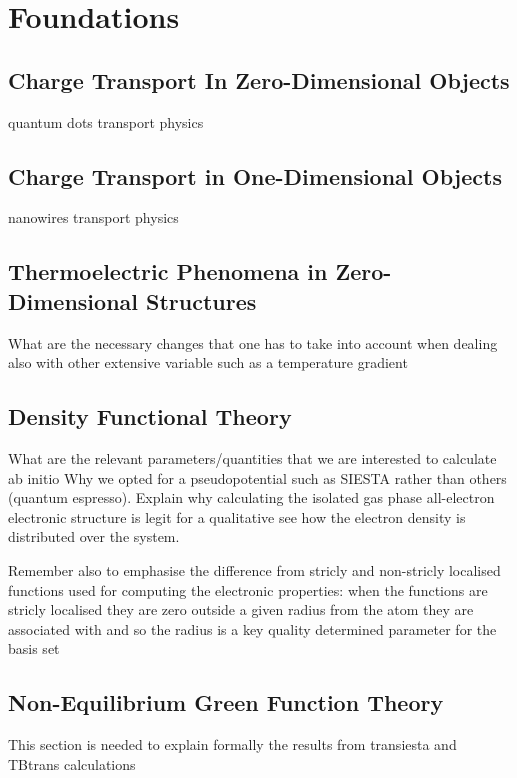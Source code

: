 \chapter{\label{ch:theory}Foundations}

\minitoc

\section{Charge Transport In Zero-Dimensional Objects}

quantum dots transport physics

\section{Charge Transport in One-Dimensional Objects}

nanowires transport physics

\section{Thermoelectric Phenomena in Zero-Dimensional Structures}

What are the necessary changes that one has to take into account
when dealing also with other extensive variable such as a temperature gradient

\section{Density Functional Theory}

What are the relevant parameters/quantities that we are interested to calculate ab initio
Why we opted for a pseudopotential such as SIESTA rather than others (quantum espresso).
Explain why calculating the isolated gas phase all-electron electronic structure is legit for a 
qualitative see how the electron density is distributed over the system.

Remember also to emphasise the difference from stricly and non-stricly localised functions
used for computing the electronic properties: when the functions are stricly localised they are zero
outside a given radius from the atom they are associated with and so the radius is a key quality determined parameter for the basis set


\section{Non-Equilibrium Green Function Theory}

This section is needed to explain formally the results from transiesta and TBtrans calculations


